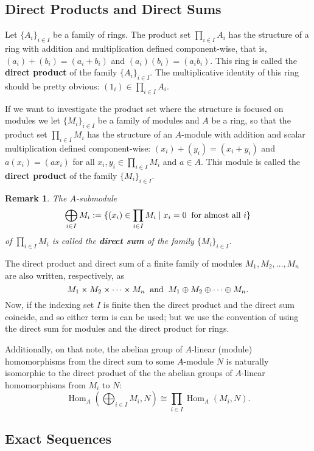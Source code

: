\documentclass[12pt,reqno]{amsart}
\theoremstyle{plain}
\newtheorem{rem}{Remark}
\DeclareMathOperator{\Hom}{Hom}
\begin{document}
\subsection{Direct Products and Direct Sums}

Let $\{ A_i \}_{i \in I}$ be a family of rings. The product set $\prod_{i \in I} A_i$ has the structure of a ring with addition and multiplication defined component-wise, that is,  $(a_i) + (b_i) = (a_i + b_i)$ and $(a_i)(b_i) = (a_i b_i)$. This ring is called the \textbf{direct product} of the family $\{ A_i\}_{i \in I}$. The multiplicative identity of this ring should be pretty obvious: $(1_i) \in \prod_{i \in I} A_i$. 

If we want to investigate the product set where the structure is focused on modules we let $\{ M_i \}_{i \in I}$ be a family of modules and $A$ be a ring, so that the product set $\prod_{i \in I} M_i$ has the structure of an $A$-module with addition and scalar multiplication defined component-wise: $(x_i) + (y_i) = (x_i + y_i)$ and $a(x_i) = (ax_i)$ for all $x_i, y_i \in \prod_{i \in I} M_i$ and $a \in A$. This module is called the \textbf{direct product} of the family $\{ M_i \}_{i \in I}$. 

\begin{rem} The $A$-submodule 
$$ \bigoplus_{ i \in I} M_i  := \{ (x_i ) \in \prod_{i \in I} M_i \mid x_i = 0 \; \; \textup{for almost all $i$} \}$$ of $\prod_{i \in I} M_i$ is called the \textbf{direct sum} of the family $\{ M_i \}_{i \in I }$. 
\end{rem} 

The direct product and direct sum of a finite family of modules $M_1, M_2, \ldots, M_n$ are also written, respectively, as 
$$M_1 \times M_2 \times \cdots \times M_n \; \; \textup{and} \; \; M_1 \oplus M_2 \oplus \cdots \oplus M_n.$$
Now, if the indexing set $I$ is finite then the direct product and the direct sum coincide, and so either term is can be used; but we use the convention of using the direct sum for modules and the direct product for rings. 

Additionally, on that note, the abelian group of $A$-linear (module) homomorphisms from the direct sum to some $A$-module $N$ is naturally isomorphic to the direct product of the the abelian groups of $A$-linear homomorphisms from $M_i$ to $N$:
$$ \Hom_A \left( \bigoplus_{i \in I} M_i , N \right) \cong \prod_{i \in I} \Hom_A (M_i, N).$$
\subsection{Exact Sequences}
\end{document}

